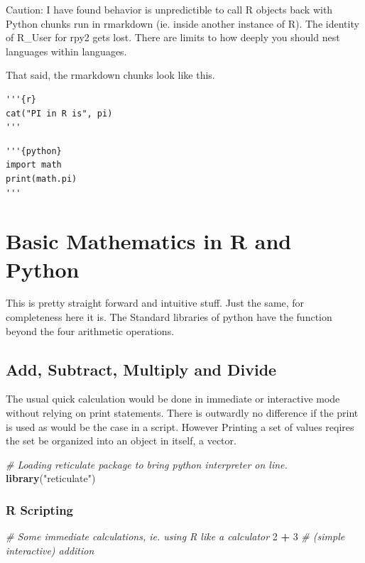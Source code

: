 \documentclass[]{book}
\newenvironment{Shaded}{\begin{snugshade}}{\end{snugshade}}
\newcommand{\KeywordTok}[1]{\textcolor[rgb]{0.13,0.29,0.53}{\textbf{#1}}}
\newcommand{\DecValTok}[1]{\textcolor[rgb]{0.00,0.00,0.81}{#1}}
\newcommand{\StringTok}[1]{\textcolor[rgb]{0.31,0.60,0.02}{#1}}
\newcommand{\CommentTok}[1]{\textcolor[rgb]{0.56,0.35,0.01}{\textit{#1}}}
\newcommand{\OperatorTok}[1]{\textcolor[rgb]{0.81,0.36,0.00}{\textbf{#1}}}
\newcommand{\NormalTok}[1]{#1}
\theoremstyle{definition}
\theoremstyle{definition}
\theoremstyle{definition}
\theoremstyle{remark}
\begin{document}
Caution: I have found behavior is unpredictible to call R objects back
with Python chunks run in rmarkdown (ie. inside another instance of R).
The identity of R\_User for rpy2 gets lost. There are limits to how
deeply you should nest languages within languages.

That said, the rmarkdown chunks look like this.

\begin{verbatim}
'''{r}
cat("PI in R is", pi)
'''
\end{verbatim}

\begin{verbatim}
'''{python}
import math
print(math.pi)
'''
\end{verbatim}

\chapter{Basic Mathematics in R and
Python}\label{basic-mathematics-in-r-and-python}

This is pretty straight forward and intuitive stuff. Just the same, for
completeness here it is. The Standard libraries of python have the
function beyond the four arithmetic operations.

\section{Add, Subtract, Multiply and
Divide}\label{add-subtract-multiply-and-divide}

The usual quick calculation would be done in immediate or interactive
mode without relying on print statements. There is outwardly no
difference if the print is used as would be the case in a script.
However Printing a set of values reqires the set be organized into an
object in itself, a vector.

\begin{Shaded}
\begin{Highlighting}[]
\CommentTok{# Loading reticulate package to bring python interpreter on line.}
\KeywordTok{library}\NormalTok{(}\StringTok{"reticulate"}\NormalTok{)}
\end{Highlighting}
\end{Shaded}

\subsection{R Scripting}\label{r-scripting}

\begin{Shaded}
\begin{Highlighting}[]
\CommentTok{# Some immediate calculations, ie. using R like a calculator}
\DecValTok{2} \OperatorTok{+}\StringTok{ }\DecValTok{3}           \CommentTok{# (simple interactive) addition}
\end{Highlighting}
\end{Shaded}
\end{document}
